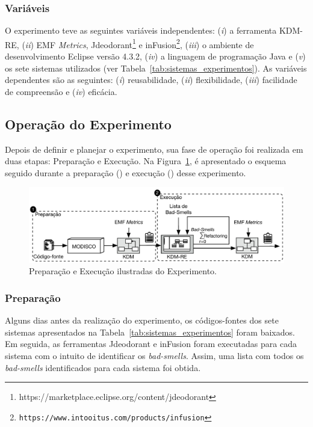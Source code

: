 \subsubsection{Variáveis}

O experimento teve as seguintes variáveis independentes: (\textit{i}) a ferramenta KDM-RE, (\textit{ii}) EMF \textit{Metrics},  Jdeodorant\footnote{https://marketplace.eclipse.org/content/jdeodorant} e inFusion\footnote{\texttt{https://www.intooitus.com/products/infusion}}, (\textit{iii}) o ambiente de desenvolvimento Eclipse versão 4.3.2, (\textit{iv}) a linguagem de programação Java e (\textit{v}) os sete sistemas utilizados (ver Tabela~\ref{tab:sistemas_experimentos}). As variáveis dependentes são as seguintes: (\textit{i}) reusabilidade, (\textit{ii}) flexibilidade, (\textit{iii}) facilidade de compreensão e (\textit{iv}) eficácia.

\subsection{Operação do Experimento}

Depois de definir e planejar o experimento, sua fase de operação foi realizada em duas etapas: Preparação e Execução. Na Figura~\ref{fig:execucao_experimento}, é apresentado o esquema seguido durante a preparação () e execução () desse experimento.

\begin{figure}[h]
	\centering
	\caption{Preparação e Execução ilustradas do Experimento.}
	\label{fig:execucao_experimento}
	\includegraphics[scale=0.9]{images/Figura_Experimento}
	\fautor
\end{figure}

\subsubsection{Preparação}

Alguns dias antes da realização do experimento, os códigos-fontes dos sete sistemas apresentados na Tabela~\ref{tab:sistemas_experimentos} foram baixados. Em seguida, as ferramentas Jdeodorant e inFusion foram executadas para cada sistema com o intuito de identificar os \textit{bad-smells}. Assim, uma lista com todos os \textit{bad-smells} identificados para cada sistema foi obtida. 


